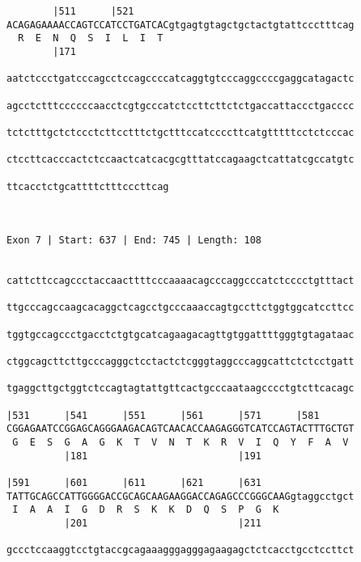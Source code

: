 \documentclass{article}
\begin{document}
\begin{Verbatim}
        |511      |521                                      
ACAGAGAAAACCAGTCCATCCTGATCACgtgagtgtagctgctactgtattccctttcag
  R  E  N  Q  S  I  L  I  T                                 
        |171                                                
  
aatctccctgatcccagcctccagccccatcaggtgtcccaggccccgaggcatagactc
                                                            
agcctctttccccccaacctcgtgcccatctccttcttctctgaccattaccctgacccc
                                                            
tctctttgctctccctcttcctttctgctttccatccccttcatgtttttcctctcccac
                                                            
ctccttcacccactctccaactcatcacgcgtttatccagaagctcattatcgccatgtc
                                                            
ttcacctctgcattttctttcccttcag
                            
                            
 
Exon 7 | Start: 637 | End: 745 | Length: 108


cattcttccagccctaccaacttttcccaaaacagcccaggcccatctcccctgtttact
                                                            
ttgcccagccaagcacaggctcagcctgcccaaaccagtgccttctggtggcatccttcc
                                                            
tggtgccagccctgacctctgtgcatcagaagacagttgtggattttgggtgtagataac
                                                            
ctggcagcttcttgcccagggctcctactctcgggtaggcccaggcattctctcctgatt
                                                            
tgaggcttgctggtctccagtagtattgttcactgcccaataagcccctgtcttcacagc
                                                            
|531      |541      |551      |561      |571      |581      
CGGAGAATCCGGAGCAGGGAAGACAGTCAACACCAAGAGGGTCATCCAGTACTTTGCTGT
 G  E  S  G  A  G  K  T  V  N  T  K  R  V  I  Q  Y  F  A  V 
          |181                          |191                
  
|591      |601      |611      |621      |631                
TATTGCAGCCATTGGGGACCGCAGCAAGAAGGACCAGAGCCCGGGCAAGgtaggcctgct
 I  A  A  I  G  D  R  S  K  K  D  Q  S  P  G  K             
          |201                          |211                
  
gccctccaaggtcctgtaccgcagaaagggagggagaagagctctcacctgcctccttct
                                                            

\end{Verbatim}
\end{document}
